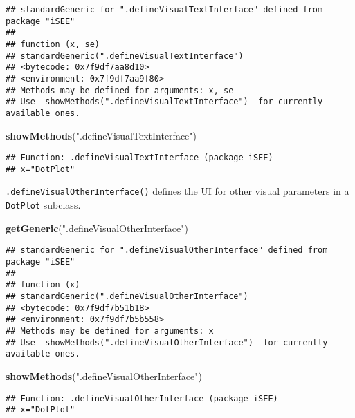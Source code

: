 \documentclass[
]{book}
\newenvironment{Shaded}{\begin{snugshade}}{\end{snugshade}}
\newcommand{\KeywordTok}[1]{\textcolor[rgb]{0.13,0.29,0.53}{\textbf{#1}}}
\newcommand{\NormalTok}[1]{#1}
\newcommand{\StringTok}[1]{\textcolor[rgb]{0.31,0.60,0.02}{#1}}
\begin{document}
\begin{verbatim}
## standardGeneric for ".defineVisualTextInterface" defined from package "iSEE"
## 
## function (x, se) 
## standardGeneric(".defineVisualTextInterface")
## <bytecode: 0x7f9df7aa8d10>
## <environment: 0x7f9df7aa9f80>
## Methods may be defined for arguments: x, se
## Use  showMethods(".defineVisualTextInterface")  for currently available ones.
\end{verbatim}

\begin{Shaded}
\begin{Highlighting}[]
\KeywordTok{showMethods}\NormalTok{(}\StringTok{".defineVisualTextInterface"}\NormalTok{)}
\end{Highlighting}
\end{Shaded}

\begin{verbatim}
## Function: .defineVisualTextInterface (package iSEE)
## x="DotPlot"
\end{verbatim}

\href{https://isee.github.io/iSEE/reference/visual-parameters-generics.html}{\texttt{.defineVisualOtherInterface()}} defines the UI for other visual parameters in a \texttt{DotPlot} subclass.

\begin{Shaded}
\begin{Highlighting}[]
\KeywordTok{getGeneric}\NormalTok{(}\StringTok{".defineVisualOtherInterface"}\NormalTok{)}
\end{Highlighting}
\end{Shaded}

\begin{verbatim}
## standardGeneric for ".defineVisualOtherInterface" defined from package "iSEE"
## 
## function (x) 
## standardGeneric(".defineVisualOtherInterface")
## <bytecode: 0x7f9df7b51b18>
## <environment: 0x7f9df7b5b558>
## Methods may be defined for arguments: x
## Use  showMethods(".defineVisualOtherInterface")  for currently available ones.
\end{verbatim}

\begin{Shaded}
\begin{Highlighting}[]
\KeywordTok{showMethods}\NormalTok{(}\StringTok{".defineVisualOtherInterface"}\NormalTok{)}
\end{Highlighting}
\end{Shaded}

\begin{verbatim}
## Function: .defineVisualOtherInterface (package iSEE)
## x="DotPlot"
\end{verbatim}
\end{document}
